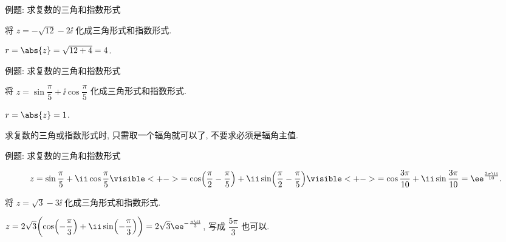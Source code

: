 \begin{frame}{例题: 求复数的三角和指数形式}
	\onslide<+->
	\begin{example}[nearnext]
		将 $z=-\sqrt{12}-2\ii$ 化成三角形式和指数形式.
	\end{example}
	\onslide<+->
	\begin{solution}[nearprev]
		$r=\abs{z}=\sqrt{12+4}=4$.
		\onslide<+->{%
			故
			\[
				z=4\biggl(\cos\Bigl(-\frac{5\pi}6\Bigr)+\ii\sin\Bigl(-
				\frac{5\pi}6\Bigr)\biggr)
				=4\ee^{-\frac{5\pi\ii}6}.
			\]
		}
		\meddel
	\end{solution}
\end{frame}


\begin{frame}{例题: 求复数的三角和指数形式}
	\beqskip{10pt}
	\onslide<+->
	\begin{example}[nearnext]
		将 $z=\sin\dfrac\pi5+\ii\cos\dfrac\pi5$ 化成三角形式和指数形式.
	\end{example}
	\onslide<+->
	\begin{solution}[nearprev]
		$r=\abs{z}=1$.
		\onslide<+->{%
			\[
				z=\cos\frac{3\pi}{10}+\ii\sin\frac{3\pi}{10}=\ee^{\frac{3\pi\ii}{10}}.
			\]
		}\bigdel
	\end{solution}
	\onslide<+->
	求复数的三角或指数形式时, 只需取一个辐角就可以了, 不要求必须是辐角主值.
	\endgroup
\end{frame}


\begin{frame}{例题: 求复数的三角和指数形式}
	\onslide<+->
	\begin{solution}[][另解]
		\[
			z=\sin\frac\pi5+\ii\cos\frac\pi5
			\visible<+->{=\cos\Bigl(\frac\pi2-\frac\pi5\Bigr)+\ii\sin\Bigl(\frac\pi2-\frac\pi5\Bigr)}
			\visible<+->{=\cos\frac{3\pi}{10}+\ii\sin\frac{3\pi}{10}=\ee^{\frac{3\pi\ii}{10}}.}
		\]
		\bigdel
	\end{solution}
	\onslide<+->
	\begin{exercise}[nearnext]
		将 $z=\sqrt 3-3\ii$ 化成三角形式和指数形式.
	\end{exercise}
	\onslide<+->
	\begin{answer}[nearprev]
		$\displaystyle z=2\sqrt3\biggl(\cos\Bigl(-\frac{\pi}3\Bigr)+\ii\sin\Bigl(-\frac{\pi}3\Bigr)\biggr)
		=2\sqrt3 \ee^{-\frac{\pi\ii}3}$, 写成 $\dfrac{5\pi}3$ 也可以.
	\end{answer}
\end{frame}


